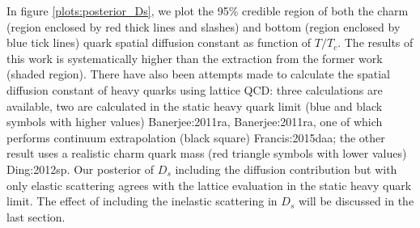 In figure \ref{plots:posterior_Ds}, we plot the 95\% credible region of both the charm (region enclosed by red thick lines and slashes) and bottom (region enclosed by blue tick lines) quark spatial diffusion constant as function of $T/T_c$.
The results of this work is systematically higher than the extraction from the former work (shaded region).
There have also been attempts made to calculate the spatial diffusion constant of heavy quarks using lattice QCD: three calculations are available, two are calculated in the static heavy quark limit (blue and black symbols with higher values) {Banerjee:2011ra, Banerjee:2011ra}, one of which performs continuum extrapolation (black square) {Francis:2015daa}; the other result uses a realistic charm quark mass (red triangle symbols with lower values) {Ding:2012sp}.
Our posterior of $D_s$ including the diffusion contribution but with only elastic scattering agrees with the lattice evaluation in the static heavy quark limit.
The effect of including the inelastic scattering in $D_s$ will be discussed in the last section.



